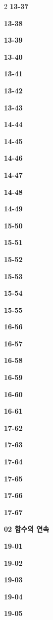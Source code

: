 \documentclass[10pt,a4paper]{article}
\begin{document}
\begin{multicols}{2}
\noindent\textbf{13-37}\ \par
\noindent\textbf{13-38}\ \par
\noindent\textbf{13-39}\ \par
\noindent\textbf{13-40}\ \par
\noindent\textbf{13-41}\ \par
\noindent\textbf{13-42}\ \par
\noindent\textbf{13-43}\ \par
\noindent\textbf{14-44}\ \par
\noindent\textbf{14-45}\ \par
\noindent\textbf{14-46}\ \par
\noindent\textbf{14-47}\ \par
\noindent\textbf{14-48}\ \par
\noindent\textbf{14-49}\ \par
\noindent\textbf{15-50}\ \par
\noindent\textbf{15-51}\ \par
\noindent\textbf{15-52}\ \par
\noindent\textbf{15-53}\ \par
\noindent\textbf{15-54}\ \par
\noindent\textbf{15-55}\ \par
\noindent\textbf{16-56}\ \par
\noindent\textbf{16-57}\ \par
\noindent\textbf{16-58}\ \par
\noindent\textbf{16-59}\ \par
\noindent\textbf{16-60}\ \par
\noindent\textbf{16-61}\ \par
\noindent\textbf{17-62}\ \par
\noindent\textbf{17-63}\ \par
\noindent\textbf{17-64}\ \par
\noindent\textbf{17-65}\ \par
\noindent\textbf{17-66}\ \par
\noindent\textbf{17-67}\ \par
\noindent\textbf{02 함수의 연속}\par\smallskip
\noindent\textbf{19-01}\ \par
\noindent\textbf{19-02}\ \par
\noindent\textbf{19-03}\ \par
\noindent\textbf{19-04}\ \par
\noindent\textbf{19-05}\ \par

\end{multicols}
\end{document}
